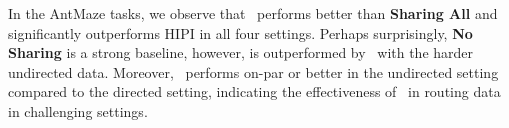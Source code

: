 
In the AntMaze tasks, we observe that \cdsmethodname\ performs better than \textbf{Sharing All} and significantly outperforms HIPI in all four settings. Perhaps surprisingly, \textbf{No Sharing} is a strong baseline, however, is outperformed by \cdsmethodname\ with the harder undirected data. Moreover, \cdsmethodname\ performs on-par or better in the undirected setting compared to the directed setting, indicating the effectiveness of \cdsmethodname\ in routing data in challenging settings. 
















